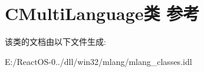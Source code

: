 \hypertarget{class_c_multi_language}{}\section{C\+Multi\+Language类 参考}
\label{class_c_multi_language}


该类的文档由以下文件生成\+:\begin{DoxyCompactItemize}
\item 
E\+:/\+React\+O\+S-\/0../dll/win32/mlang/mlang\+\_\+classes.\+idl\end{DoxyCompactItemize}
